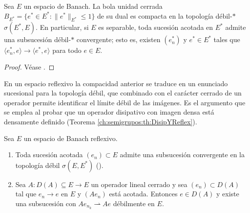 \begin{Teorema}
\label{ch:preliminares:th:banachAlaoglu}

Sea $E$ un espacio de Banach. La bola unidad cerrada
$B_{E^*} = \{e^* \in E^* : \lVert e^* \rVert_{E^*} \leq 1\}$ de su dual es compacta
en la topología débil-$*$ $\sigma(E^*, E)$. En particular, si $E$ es separable,
toda sucesión acotada en $E^*$ admite una subsucesión débil-$*$ convergente; esto
es, existen $(e_n^*)$ y $e^* \in E^*$ tales que
$\langle e_n^*, e \rangle \rightarrow \langle e^*, e \rangle$ para todo $e \in E$.
\end{Teorema}

\begin{proof}
Véase \cite[Teorema~3.16]{brezis-2011-fun-ana-sob}.
\end{proof}

En un espacio reflexivo la compacidad anterior se traduce en un enunciado
sucesional para la topología débil, que combinado con el carácter cerrado de un
operador permite identificar el límite débil de las imágenes. Es el argumento que
se emplea al probar que un operador disipativo con imagen densa está densamente
definido (Teorema \ref{ch:semigrupos:th:DisipYReflex}).\\

\begin{Teorema}
\label{ch:preliminares:th:compacidadDebilCerrado}

Sea $E$ un espacio de Banach reflexivo.

\begin{enumerate}
    \item Toda sucesión acotada $(e_n) \subset E$ admite una subsucesión
    convergente en la topología débil $\sigma(E, E^*)$
    (\cite[Teorema~3.18]{brezis-2011-fun-ana-sob}).

    \item Sea $A : D(A) \subseteq E \rightarrow E$ un operador lineal cerrado y sea
    $(e_n) \subset D(A)$ tal que $e_n \rightarrow e$ en $E$ y $(Ae_n)$ está acotada.
    Entonces $e \in D(A)$ y existe una subsucesión con
    $Ae_{n_k} \rightharpoonup Ae$ débilmente en $E$.
\end{enumerate}
\end{Teorema}

